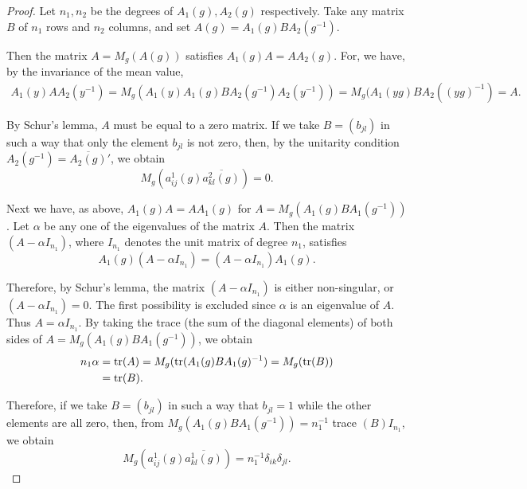 \begin{proof}
 Let $n_{1}, n_{2}$ be the degrees of $A_{1}(g), A_{2}(g)$ respectively. Take any matrix $B$ of $n_{1}$ rows and $n_{2}$ columns, and set $A(g) = A_{1}(g) BA_{2}(g^{-1})$. 

Then the matrix $A = M_g(A(g))$ satisfies $A_1(g)A = AA_2(g)$. For, we have, by the invariance of the mean value, 
\[
\begin{gathered}
A _{1} (y) A A _{2} (y ^{-1}) = M _{g} (A _{1} (y) A _{1} (g) B A _{2} (g ^{-1}) A _{2} (y ^{-1})) = M _{g} (A _{1} (y g) B A _{2} ((y g) ^{-1}) = A.
\end{gathered}
\]

By Schur's lemma, $A$ must be equal to a zero matrix. If we take $B = (b_{jl})$ in such a way that only the element $b_{jl}$ is not zero, then, by the unitarity condition $A_{2}(g^{-1}) = \overline{A_{2}(g)}'$, we obtain 
\[
M _{g} (a _{ij} ^{1} (g) \overline {{a _{kl} ^{2} (g)}}) = 0.
\]


Next we have, as above, $A_{1}(g)A = AA_{1}(g)$ for $A = M_{g}(A_{1}(g)BA_{1}(g^{-1}))$. Let $\alpha$ be any one of the eigenvalues of the matrix $A$. Then the matrix $(A - \alpha I_{n_1})$, where $I_{n_1}$ denotes the unit matrix of degree $n_1$, satisfies 
\[
A _{1} (g) \left(A - \alpha I _ {n _{1}}\right) = \left(A - \alpha I _ {n _{1}}\right) A _{1} (g).
\]

Therefore, by Schur's lemma, the matrix $(A - \alpha I_{n_1})$ is either non-singular, or $(A - \alpha I_{n_1}) = 0$. The first possibility is excluded since $\alpha$ is an eigenvalue of $A$. Thus $A = \alpha I_{n_1}$. By taking the trace (the sum of the diagonal elements) of both sides of $A = M_g(A_1(g)BA_1(g^{-1}))$, we obtain 
\[
\begin{aligned} n _{1} \alpha & = \operatorname{tr} (A) = M _{g} (\operatorname{tr} (A _{1} (g) B A _{1} (g) ^{-1}) = M _{g} (\operatorname{tr} (B)) \\ & = \operatorname{tr} (B). \end{aligned}
\]

Therefore, if we take $B = (b_{jl})$ in such a way that $b_{jl} = 1$ while the other elements are all zero, then, from $M_g(A_1(g)BA_1(g^{-1})) = n_1^{-1}$ trace $(B)I_{n_1}$, we obtain 
\[
M _{g} \left(a _{ij} ^{1} (g) \overline {{{a _{kl} ^{1} (g)}}}\right) = n _{1} ^{-1} \delta_{ik} \delta_{jl}.
\]
\end{proof}

